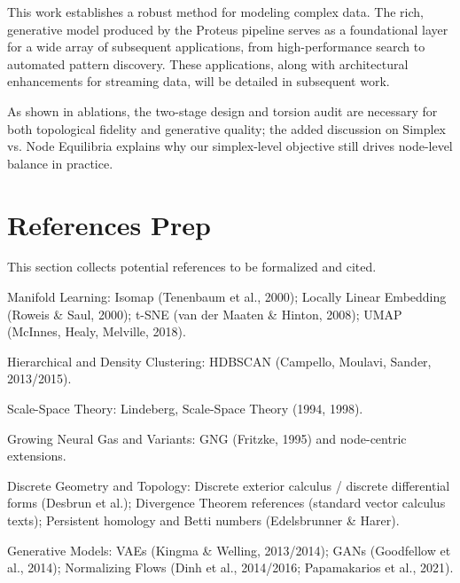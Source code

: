 \documentclass[11pt]{article}
\begin{document}
This work establishes a robust method for modeling complex data. The rich, generative model produced by the Proteus pipeline serves as a foundational layer for a wide array of subsequent applications, from high-performance search to automated pattern discovery. These applications, along with architectural enhancements for streaming data, will be detailed in subsequent work.

As shown in ablations, the two-stage design and torsion audit are necessary for both topological fidelity and generative quality; the added discussion on Simplex vs. Node Equilibria explains why our simplex-level objective still drives node-level balance in practice.

\section{References Prep}

This section collects potential references to be formalized and cited.

{\setlength{\parindent}{0pt}%
\setlength{\parskip}{0.6em}%

Manifold Learning: Isomap (Tenenbaum et al., 2000); Locally Linear Embedding (Roweis \& Saul, 2000); t-SNE (van der Maaten \& Hinton, 2008); UMAP (McInnes, Healy, Melville, 2018).

Hierarchical and Density Clustering: HDBSCAN (Campello, Moulavi, Sander, 2013/2015).

Scale-Space Theory: Lindeberg, Scale-Space Theory (1994, 1998).

Growing Neural Gas and Variants: GNG (Fritzke, 1995) and node-centric extensions.

Discrete Geometry and Topology: Discrete exterior calculus / discrete differential forms (Desbrun et al.); Divergence Theorem references (standard vector calculus texts); Persistent homology and Betti numbers (Edelsbrunner \& Harer).

Generative Models: VAEs (Kingma \& Welling, 2013/2014); GANs (Goodfellow et al., 2014); Normalizing Flows (Dinh et al., 2014/2016; Papamakarios et al., 2021).

}
\end{document}
